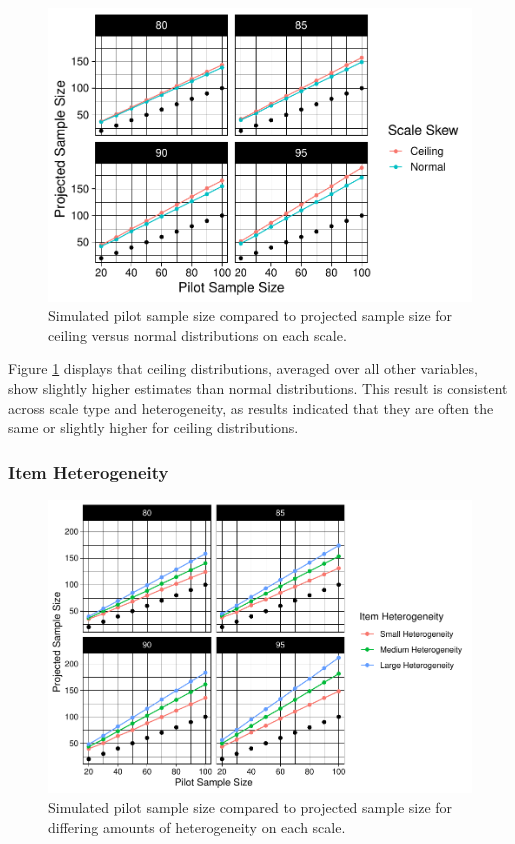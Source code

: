 \documentclass[
  man]{apa7}
\begin{document}
\begin{figure}
\centering
\includegraphics{manuscript_draft_files/figure-latex/scale-skew-figure-1.pdf}
\caption{\label{fig:scale-skew-figure}Simulated pilot sample size compared to projected sample size for ceiling versus normal distributions on each scale.}
\end{figure}

Figure \ref{fig:scale-skew-figure} displays that ceiling distributions, averaged over all other variables, show slightly higher estimates than normal distributions. This result is consistent across scale type and heterogeneity, as results indicated that they are often the same or slightly higher for ceiling distributions.

\hypertarget{item-heterogeneity}{%
\subsubsection{Item Heterogeneity}\label{item-heterogeneity}}

\begin{figure}
\centering
\includegraphics{manuscript_draft_files/figure-latex/scale-hetero-figure-1.pdf}
\caption{\label{fig:scale-hetero-figure}Simulated pilot sample size compared to projected sample size for differing amounts of heterogeneity on each scale.}
\end{figure}
\end{document}
